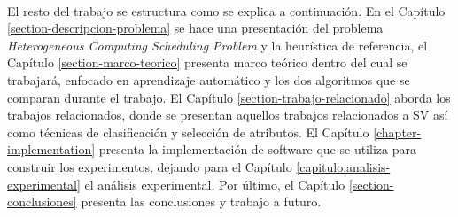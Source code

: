\paragraph{} El resto del trabajo se estructura como se explica a continuación. En el Capítulo \ref{section-descripcion-problema} se hace una presentación del problema \textit{Heterogeneous Computing Scheduling Problem} y la heurística de referencia, el Capítulo \ref{section-marco-teorico} presenta marco teórico dentro del cual se trabajará, enfocado en aprendizaje automático y los dos algoritmos que se comparan durante el trabajo. El Capítulo \ref{section-trabajo-relacionado} aborda los trabajos relacionados, donde se presentan aquellos trabajos relacionados a SV así como técnicas de clasificación y selección de atributos. El Capítulo \ref{chapter-implementation} presenta la implementación de software que se utiliza para construir los experimentos, dejando para el Capítulo \ref{capitulo:analisis-experimental} el análisis experimental. Por último, el Capítulo \ref{section-conclusiones} presenta las conclusiones y trabajo a futuro.
